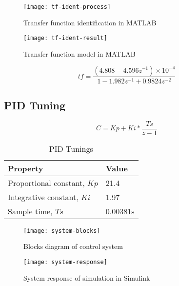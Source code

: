 \begin{figure}[h]
    \centering
    \texttt{[image: tf-ident-process]}
    \caption{Transfer function identification in MATLAB}
    \label{fig:tf-indent-process}
\end{figure}

\begin{figure}[h]
    \centering
    \texttt{[image: tf-ident-result]}
    \caption{Transfer function model in MATLAB}
    \label{fig:tf-result}
\end{figure}


\begin{equation}
    \label{eq:tf}
    tf=\frac{(4.808-4.596z^{-1})\times10^{-4}}{1-1.982z^{-1}+0.9824z^{-2}}
\end{equation}


\subsection{PID Tuning}

\begin{equation}
    C = Kp + Ki * \frac{Ts}{z-1}
\end{equation}

\begin{table}[h]
    \centering
    \caption{PID Tunings}
    \label{tab:pid-tunings}
    \begin{tabular}{ll}
    \toprule
    Property & Value \\
    \midrule
    Proportional constant, $Kp$  & 21.4 \\
    Integrative constant, $Ki$ & 1.97 \\
    Sample time, $Ts$ & $0.00381$s \\
    \bottomrule
    \end{tabular}
\end{table}

\begin{figure}[h]
    \centering
    \texttt{[image: system-blocks]}
    \caption{Blocks diagram of control system}
    \label{fig:system-blocks}
\end{figure}

\begin{figure}[h]
    \centering
    \texttt{[image: system-response]}
    \caption{System response of simulation in Simulink}
    \label{fig:system-response}
\end{figure}